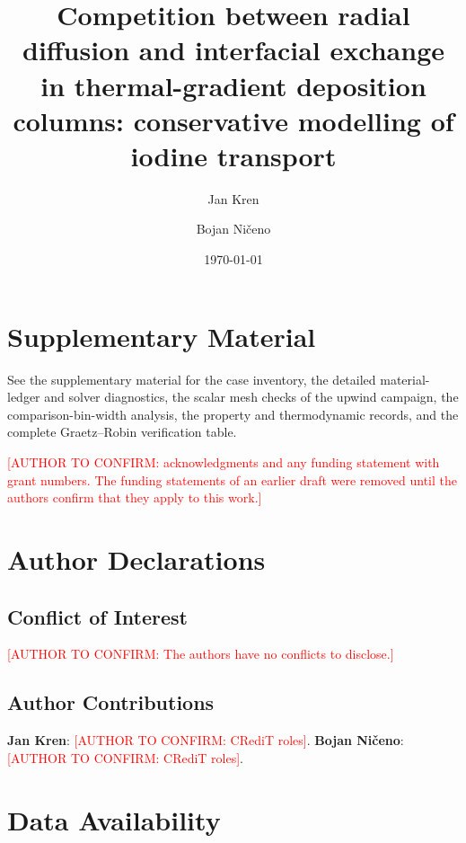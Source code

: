\documentclass[aip,pof,reprint,amsmath,amssymb]{revtex4-2}
\newcommand{\confirm}[1]{\textcolor{red}{[AUTHOR TO CONFIRM: #1]}}
\begin{document}

\title{Competition between radial diffusion and interfacial exchange in
thermal-gradient deposition columns: conservative modelling of iodine
transport}

\author{Jan Kren}
\author{Bojan Ni\v{c}eno}

\date{\today}

\begin{abstract}

\end{abstract}

\maketitle











\section*{Supplementary Material}
See the supplementary material for the case inventory, the detailed
material-ledger and solver diagnostics, the scalar mesh checks of the
upwind campaign, the comparison-bin-width analysis, the property and
thermodynamic records, and the complete Graetz--Robin verification
table.

\begin{acknowledgments}
\confirm{acknowledgments and any funding statement with grant numbers.
The funding statements of an earlier draft were removed until the authors
confirm that they apply to this work.}
\end{acknowledgments}

\section*{Author Declarations}
\subsection*{Conflict of Interest}
\confirm{The authors have no conflicts to disclose.}

\subsection*{Author Contributions}
\textbf{Jan Kren}: \confirm{CRediT roles}.
\textbf{Bojan Ni\v{c}eno}: \confirm{CRediT roles}.

\section*{Data Availability}




\end{document}
